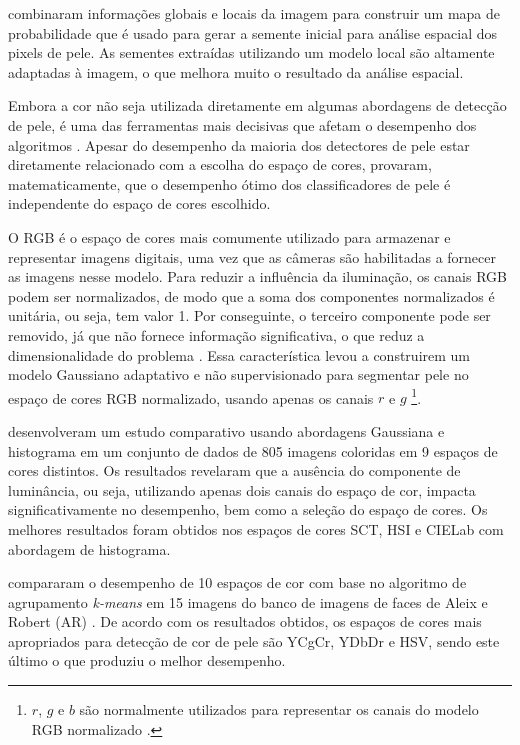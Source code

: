 \citet{kawulok:13} combinaram informações globais e locais da imagem para construir um mapa de probabilidade que é usado para gerar a semente inicial para análise espacial dos pixels de pele. As sementes extraídas utilizando um modelo local são altamente adaptadas à imagem, o que melhora muito o resultado da análise espacial.

Embora a cor não seja utilizada diretamente em algumas abordagens de detecção de pele, é uma das ferramentas mais decisivas que afetam o desempenho dos algoritmos \citep{mahmoodi:16}. Apesar do desempenho da maioria dos detectores de pele estar diretamente relacionado com a escolha do espaço de cores, \citet{albiol:01} provaram, matematicamente, que o desempenho ótimo dos classificadores de pele é independente do espaço de cores escolhido.

O RGB é o espaço de cores mais comumente utilizado para armazenar e representar imagens digitais, uma vez que as câmeras são habilitadas a fornecer as imagens nesse modelo. Para reduzir a influência da iluminação, os canais RGB podem ser normalizados, de modo que a soma dos componentes normalizados é unitária, ou seja, tem valor 1. Por conseguinte, o terceiro componente pode ser removido, já que não fornece informação significativa, o que reduz a dimensionalidade do problema \citep{kakumanu:07}. Essa característica levou \citet{bergasa:00} a construirem um modelo Gaussiano adaptativo e não supervisionado para segmentar pele no espaço de cores RGB normalizado, usando apenas os canais $r$ e $g$ \footnote{$r$, $g$ e $b$ são normalmente utilizados para representar os canais do modelo RGB normalizado \citep{gonzalez:02}.}.

\citet{jayaram:04} desenvolveram um estudo comparativo usando abordagens Gaussiana e histograma em um conjunto de dados de 805 imagens coloridas em 9 espaços de cores distintos. Os resultados revelaram que a ausência do componente de luminância, ou seja, utilizando apenas dois canais do espaço de cor, impacta significativamente no desempenho, bem como a seleção do espaço de cores. Os melhores resultados foram obtidos nos espaços de cores SCT, HSI e CIELab com abordagem de histograma.

\citet{chaves:10} compararam o desempenho de 10 espaços de cor com base no algoritmo de agrupamento \emph{k-means} em 15 imagens do banco de imagens de faces de Aleix e Robert (AR) \citep{ar-face-database:98}. De acordo com os resultados obtidos, os espaços de cores mais apropriados para detecção de cor de pele são YCgCr, YDbDr e HSV, sendo este último o que produziu o melhor desempenho.

